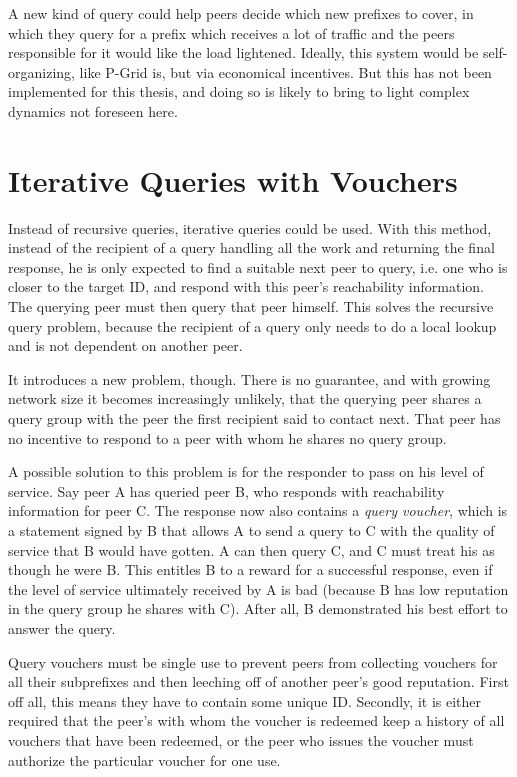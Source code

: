 A new kind of query could help peers decide which new prefixes to cover, in
which they query for a prefix which receives a lot of traffic and the peers
responsible for it would like the load lightened. Ideally, this system would be
self-organizing, like P-Grid is, but via economical incentives. But this has not
been implemented for this thesis, and doing so is likely to bring to light
complex dynamics not foreseen here.

\section{Iterative Queries with Vouchers}
\label{sec:desc_iterative_vouchers}
Instead of recursive queries, iterative queries could be used. With this method,
instead of the recipient of a query handling all the work and returning the
final response, he is only expected to find a suitable next peer to query, i.e.
one who is closer to the target ID, and respond with this peer's reachability
information. The querying peer must then query that peer himself. This solves
the recursive query problem, because the recipient of a query only needs to do a
local lookup and is not dependent on another peer.

It introduces a new problem, though. There is no guarantee, and with growing
network size it becomes increasingly unlikely, that the querying peer shares a
query group with the peer the first recipient said to contact next. That peer
has no incentive to respond to a peer with whom he shares no query group.

A possible solution to this problem is for the responder to pass on his level of
service. Say peer A has queried peer B, who responds with reachability
information for peer C. The response now also contains a \emph{query voucher},
which is a statement signed by B that allows A to send a query to C with the
quality of service that B would have gotten. A can then query C, and C must
treat his as though he were B. This entitles B to a reward for a successful
response, even if the level of service ultimately received by A is bad (because
B has low reputation in the query group he shares with C). After all, B
demonstrated his best effort to answer the query.

Query vouchers must be single use to prevent peers from collecting vouchers for
all their subprefixes and then leeching off of another peer's good reputation.
First off all, this means they have to contain some unique ID. Secondly, it is
either required that the peer's with whom the voucher is redeemed keep a history
of all vouchers that have been redeemed, or the peer who issues the voucher must
authorize the particular voucher for one use.


